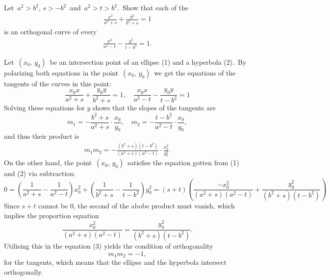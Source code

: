 \documentclass[12pt]{article}
\theoremstyle{definition}
\begin{document}
Let\, $a^2 > b^2$,\; $s > -b^2$\, and\, $a^2 > t > b^2$.\, Show that each of the 
\begin{align}
\frac{x^2}{a^2+s}+\frac{y^2}{b^2+s} = 1
\end{align}
is an orthogonal curve of every 
\begin{align}
\frac{x^2}{a^2-t}-\frac{y^2}{t-b^2} = 1.
\end{align}


Let\, $(x_0,\,y_0)$\, be an intersection point of an ellipse (1) and a hyperbola (2).\, By polarizing both equations in the point \,$(x_0,\,y_0)$\, we get the equations of the tangents of the curves in this point:
$$\frac{x_0x}{a^2+s}+\frac{y_0y}{b^2+s} = 1, \quad \frac{x_0x}{a^2-t}-\frac{y_0y}{t-b^2} = 1$$
Solving these equations for $y$ shows that the slopes of the tangents are
$$m_1 = -\frac{b^2+s}{a^2+s}\!\cdot\!\frac{x_0}{y_0}, \quad m_2 = -\frac{t-b^2}{a^2-t}\!\cdot\!\frac{x_0}{y_0},$$
and thus their product is
\begin{align}
m_1m_2 = -\frac{(b^2+s)(t-b^2)}{(a^2+s)(a^2-t)}\!\cdot\!\frac{x_0^2}{y_0^2}.
\end{align}
On the other hand, the point\, $(x_0,\,y_0)$\, satisfies the equation gotten from (1) and (2) via subtraction:
$$0 = \left(\frac{1}{a^2+s}-\frac{1}{a^2-t}\right)x_0^2+\left(\frac{1}{b^2+s}-\frac{1}{t-b^2}\right)y_0^2
= (s+t)\left(\frac{-x_0^2}{(a^2+s)(a^2-t)}+\frac{y_0^2}{(b^2+s)(t-b^2)}\right)$$
Since $s\!+\!t$ cannot be 0, the second  of the abobe product must vanish, which implies the proportion equation
$$\frac{x_0^2}{(a^2+s)(a^2-t)} = \frac{y_0^2}{(b^2+s)(t-b^2)}.$$
Utilising this in the equation (3) yields the condition of orthogonality
$$m_1m_2 = -1,$$ 
for the tangents, which means that the ellipse and the hyperbola intersect orthogonally.\\
\end{document}
